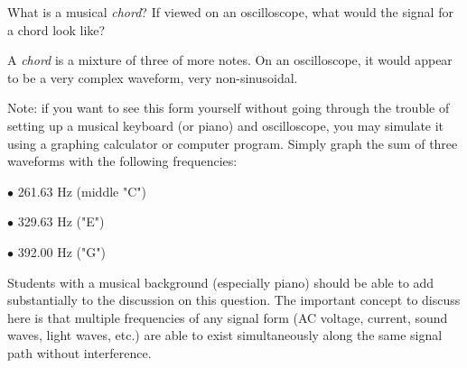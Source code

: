 

What is a musical {\it chord}?  If viewed on an oscilloscope, what would the signal for a chord look like?







A {\it chord} is a mixture of three of more notes.  On an oscilloscope, it would appear to be a very complex waveform, very non-sinusoidal.

\vskip 10pt

Note: if you want to see this form yourself without going through the trouble of setting up a musical keyboard (or piano) and oscilloscope, you may simulate it using a graphing calculator or computer program.  Simply graph the sum of three waveforms with the following frequencies:

\medskip
\item{$\bullet$} 261.63 Hz (middle "C")
\item{$\bullet$} 329.63 Hz ("E")
\item{$\bullet$} 392.00 Hz ("G")
\medskip







Students with a musical background (especially piano) should be able to add substantially to the discussion on this question.  The important concept to discuss here is that multiple frequencies of any signal form (AC voltage, current, sound waves, light waves, etc.) are able to exist simultaneously along the same signal path without interference.




